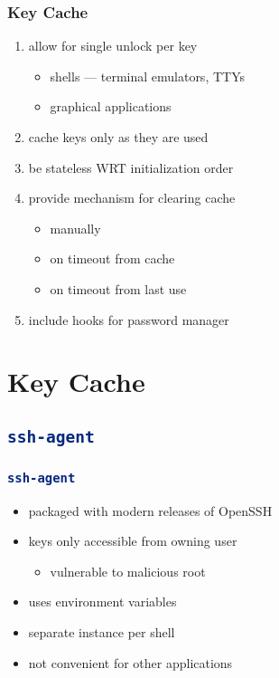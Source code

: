 \documentclass[]{beamer}
\renewcommand{\sh}[1]{\lstinline[columns=fixed,language=sh]{#1}}
\begin{document}
\begin{frame}
  \frametitle{Key Cache}
  \begin{enumerate}
  \item\pause
    allow for single unlock per key
    \begin{itemize}
    \item
      shells --- terminal emulators, TTYs
    \item
      graphical applications
    \end{itemize}
  \item\pause
    cache keys only as they are used
  \item\pause
    be stateless WRT initialization order
  \item\pause
    provide mechanism for clearing cache
    \begin{itemize}
    \item
      manually
    \item
      on timeout from cache
    \item
      on timeout from last use
    \end{itemize}
  \item\pause
    include hooks for password manager
  \end{enumerate}
\end{frame}

\section{Key Cache}
\subsection{\sh{ssh-agent}}
\begin{frame}
  \frametitle{\sh{ssh-agent}}
  \begin{itemize}
  \item\pause
    packaged with modern releases of OpenSSH
  \item\pause
    keys only accessible from owning user
    \begin{itemize}
    \item
      vulnerable to malicious root
    \end{itemize}
  \item\pause
    uses environment variables
  \item\pause
    separate instance per shell
  \item\pause
    not convenient for other applications
  \end{itemize}
\end{frame}
\end{document}
